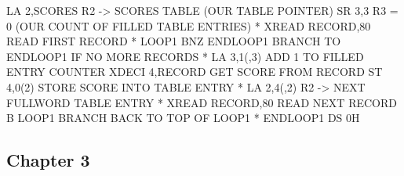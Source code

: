 \documentclass{report}
\begin{document}
\begin{itemize}
            \bigbreak \noindent 
            \begin{cppcode}
                LA 2,SCORES R2 -> SCORES TABLE (OUR TABLE POINTER)
                SR 3,3 R3 = 0 (OUR COUNT OF FILLED TABLE ENTRIES)
                *
                XREAD RECORD,80 READ FIRST RECORD
                *
            LOOP1 BNZ ENDLOOP1 BRANCH TO ENDLOOP1 IF NO MORE RECORDS
                *
                LA 3,1(,3) ADD 1 TO FILLED ENTRY COUNTER
                XDECI 4,RECORD GET SCORE FROM RECORD
                ST 4,0(2) STORE SCORE INTO TABLE ENTRY
                *
                LA 2,4(,2) R2 -> NEXT FULLWORD TABLE ENTRY
                *
                XREAD RECORD,80 READ NEXT RECORD
                B LOOP1 BRANCH BACK TO TOP OF LOOP1
                *
                ENDLOOP1 DS 0H
            \end{cppcode}
    \end{itemize}

    \pagebreak 
    \bigbreak \noindent 
    \subsection{Chapter 3}
    \bigbreak \noindent 
\end{document}
